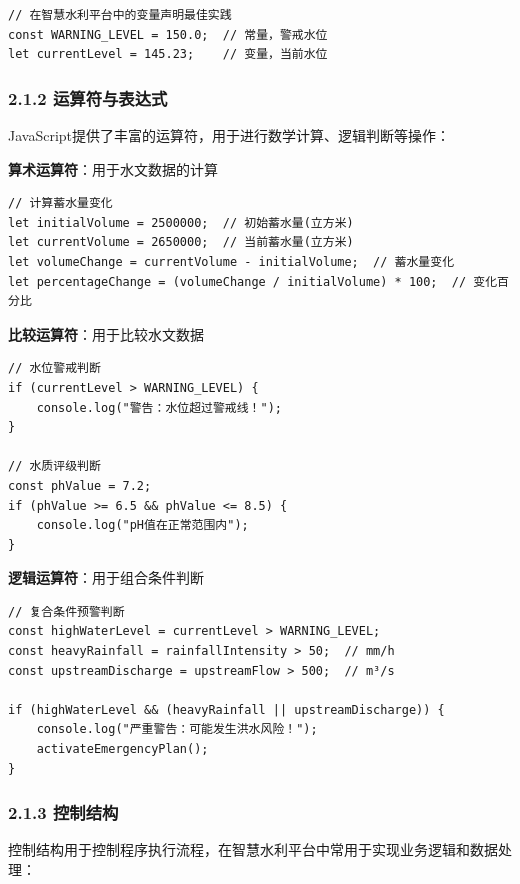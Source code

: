 \begin{lstlisting}
// 在智慧水利平台中的变量声明最佳实践
const WARNING_LEVEL = 150.0;  // 常量，警戒水位
let currentLevel = 145.23;    // 变量，当前水位
\end{lstlisting}

\subsubsection{2.1.2
运算符与表达式}\label{ux8fd0ux7b97ux7b26ux4e0eux8868ux8fbeux5f0f}

JavaScript提供了丰富的运算符，用于进行数学计算、逻辑判断等操作：

\textbf{算术运算符}：用于水文数据的计算

\begin{lstlisting}
// 计算蓄水量变化
let initialVolume = 2500000;  // 初始蓄水量(立方米)
let currentVolume = 2650000;  // 当前蓄水量(立方米)
let volumeChange = currentVolume - initialVolume;  // 蓄水量变化
let percentageChange = (volumeChange / initialVolume) * 100;  // 变化百分比
\end{lstlisting}

\textbf{比较运算符}：用于比较水文数据

\begin{lstlisting}
// 水位警戒判断
if (currentLevel > WARNING_LEVEL) {
    console.log("警告：水位超过警戒线！");
}

// 水质评级判断
const phValue = 7.2;
if (phValue >= 6.5 && phValue <= 8.5) {
    console.log("pH值在正常范围内");
}
\end{lstlisting}

\textbf{逻辑运算符}：用于组合条件判断

\begin{lstlisting}
// 复合条件预警判断
const highWaterLevel = currentLevel > WARNING_LEVEL;
const heavyRainfall = rainfallIntensity > 50;  // mm/h
const upstreamDischarge = upstreamFlow > 500;  // m³/s

if (highWaterLevel && (heavyRainfall || upstreamDischarge)) {
    console.log("严重警告：可能发生洪水风险！");
    activateEmergencyPlan();
}
\end{lstlisting}

\subsubsection{2.1.3 控制结构}\label{ux63a7ux5236ux7ed3ux6784}

控制结构用于控制程序执行流程，在智慧水利平台中常用于实现业务逻辑和数据处理：

